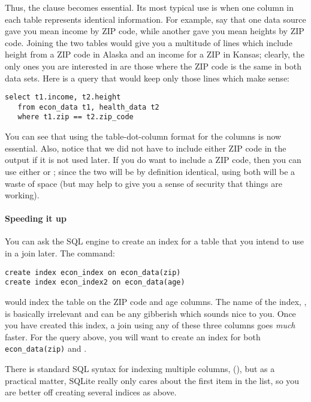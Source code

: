 Thus, the  clause becomes essential. Its most typical use is
when one column in each table represents identical information. For
example, say that one data source gave you mean income by ZIP code,
while another gave you mean heights by ZIP code. Joining the two tables
would give you a multitude of lines which include height from a ZIP code
in Alaska and an income for a ZIP in Kansas; clearly, the only ones you
are interested in are those where the ZIP code is the same in both data
sets. Here is a query that would keep only those lines which make
sense:

\begin{lstlisting}
select t1.income, t2.height
   from econ_data t1, health_data t2
   where t1.zip == t2.zip_code
\end{lstlisting}

You can see that using the table-dot-column format for the columns is now
essential. Also, notice that we did not have to include either ZIP code
in the output if it is not used later. If you do want to include a ZIP
code, then you can use either  or ; since
the two will be by definition identical, using both will be a waste of
space (but may help to give you a sense of security that things are working).

\paragraph{Speeding it up}
You can ask the SQL engine to create an index for a table that you
intend to use in a join later. The command:
\begin{lstlisting}
create index econ_index on econ_data(zip)
create index econ_index2 on econ_data(age)
\end{lstlisting}
would index the table  on the ZIP code and age columns.
The name of the index, , is basically irrelevant and can
be any gibberish which sounds nice to you. Once you have created this
index, a join using any of these three columns goes {\sl much} faster.
For the query above, you will want to create an index for both {\tt
econ\_data(zip)} and .

There is standard SQL syntax for indexing multiple columns, 
(), but as a
practical matter, SQLite really only cares about the first item in the
list, so you are better off creating several indices as above.

